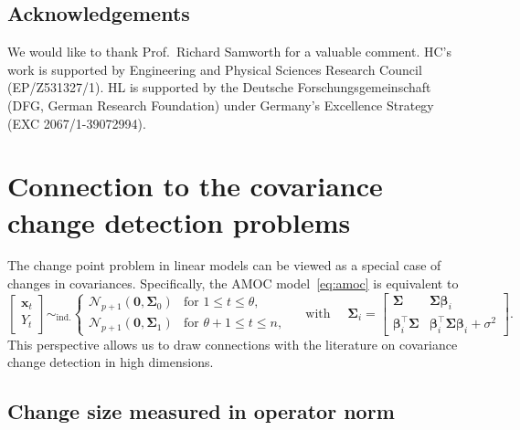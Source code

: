 \documentclass[11pt, a4paper]{article}
\newcommand{\mbf}{\mathbf}
\newcommand{\mc}{\mathcal}
\newcommand{\bmx}{\begin{bmatrix}}
\newcommand{\emx}{\end{bmatrix}}
\renewcommand{\l}{\left}
\renewcommand{\r}{\right}
\newcommand{\cp}{\theta}
\theoremstyle{definition}
\theoremstyle{definition}
\theoremstyle{definition}
\theoremstyle{definition}
\theoremstyle{definition}
\theoremstyle{remark}
\theoremstyle{definition}
\theoremstyle{definition}
\theoremstyle{definition}
\begin{document}
\subsection*{Acknowledgements}

We would like to thank Prof.\ Richard Samworth for a valuable comment.
HC's work is supported by Engineering and Physical Sciences Research Council (EP/Z531327/1).
HL is supported by the Deutsche Forschungsgemeinschaft (DFG, German Research Foundation) under Germany's Excellence Strategy (EXC 2067/1-39072994).
\clearpage




\clearpage

\appendix


\section{Connection to the covariance change detection problems}
\label{sec:cov}

The change point problem in linear models can be viewed as a special case of changes in covariances. Specifically, the AMOC model~\eqref{eq:amoc} is equivalent to  
\[
\bmx
\mbf x_t\\
Y_t
\emx
\sim_{\mathrm{ind.}} 
\begin{cases}
\mc N_{p+1}\l(\mbf 0, \bm\Sigma_0\r) & \text{for \ } 1 \le t \le \cp, \\
\mc N_{p+1}\l(\mbf 0, \bm\Sigma_1\r) & \text{for \ } \cp + 1 \le t \le n, 
\end{cases}
\quad\text{ with }\quad \bm\Sigma_i =\bmx\bm\Sigma & \bm\Sigma\bm\beta_i \\
\bm\beta_i^\top\bm\Sigma & \bm\beta_i^\top \bm\Sigma\bm\beta_i  + \sigma^2\emx.
\]
This perspective allows us to draw connections with the literature on covariance change detection in high dimensions.

\subsection{Change size measured in operator norm}
\end{document}
